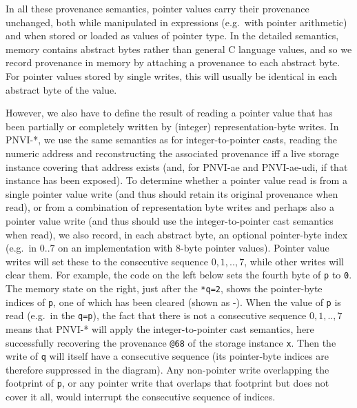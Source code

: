 \documentclass[acmsmall,review,screen]{acmart}\settopmatter{printfolios=true,printccs=false,printacmref=false}
\newcommand{\myparagraph}[1]{\vspace{0.5\baselineskip}\par\noindent{\normalsize\bfseries{#1}}\quad}
\begin{document}
\myparagraph{Reading pointer values from byte writes}
In all these provenance semantics, pointer values carry their
provenance unchanged, both while manipulated in expressions (e.g.~with pointer
arithmetic) and when stored or loaded as values of pointer type.
%
In the detailed semantics, memory contains abstract bytes rather than
general C language values, and so we record provenance in memory by attaching
a provenance to each abstract byte.  For pointer values stored by
single writes, this will usually be identical in each abstract byte of
the value.

However, we also have to define the result of reading a pointer value that has been partially or completely
written by (integer) representation-byte writes. 
In PNVI-*,
 we use the same
semantics as for integer-to-pointer casts, reading the numeric address and
reconstructing the associated provenance iff a live storage
instance covering that address exists (and, for PNVI-ae and
PNVI-ae-udi, if that instance has been exposed).
%
To determine whether a pointer value read is from a single pointer
value write (and
thus should retain its original provenance when read), or from a combination of
representation byte writes and perhaps also a pointer value write (and
thus should use the integer-to-pointer cast semantics when read),
we also record, in each abstract byte, an optional pointer-byte index
(e.g.~in $0..7$ on an implementation with 8-byte pointer values). 
Pointer value writes will set these to the consecutive sequence
$0,1,..,7$, while other writes will clear them. 
%
For example, the code on the left below sets the fourth byte of
\lstinline{p} to \lstinline{0}. The memory state on the right, just
after the \lstinline{*q=2}, shows the pointer-byte indices of
\lstinline{p}, one of which has been cleared (shown as -).  When the
value of \lstinline{p} is read (e.g.~in the \lstinline{q=p}), the fact
that there is not a consecutive sequence $0,1,..,7$ means that PNVI-*
will apply the integer-to-pointer cast semantics, here successfully
recovering the provenance \lstinline{@68} of the storage instance
\lstinline{x}.  Then the write of \lstinline{q} will itself have a
consecutive sequence (its pointer-byte indices are therefore
suppressed in the diagram).  Any non-pointer write overlapping the
footprint of \lstinline{p}, or any pointer write that overlaps that
footprint but does not cover it all, would interrupt the consecutive
sequence of indices.  
\end{document}
